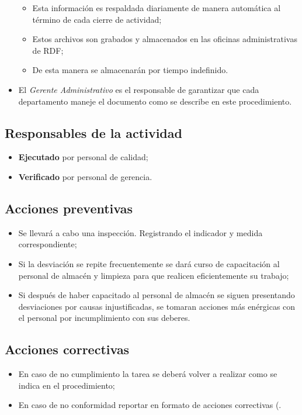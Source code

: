 \begin{itemize}
	\begin{itemize}
		\item Esta información es respaldada diariamente de manera automática al término de cada cierre de actividad;
		\item Estos archivos son grabados y almacenados en las oficinas administrativas de \gls{RDF};
		\item De esta manera se almacenarán por tiempo indefinido.
	\end{itemize}
	\item El \emph{Gerente Administrativo} es el responsable de garantizar que cada departamento maneje el documento como se describe en este procedimiento.
\end{itemize}

\subsection{Responsables de la actividad}
\begin{itemize}
	\item \textbf{Ejecutado} por personal de calidad;
	\item \textbf{Verificado} por personal de gerencia.
\end{itemize}

\subsection{Acciones preventivas}
\begin{itemize}
	\item Se llevará a cabo una inspección. Registrando el indicador y medida correspondiente;
	\item Si la desviación se repite frecuentemente se dará curso de capacitación al personal de almacén y limpieza para que realicen eficientemente su trabajo;
	\item Si después de haber capacitado al personal de almacén se siguen presentando desviaciones por causas injustificadas, se tomaran acciones más enérgicas con el personal por incumplimiento con sus deberes.
\end{itemize}

\subsection{Acciones correctivas}
\begin{itemize}
	\item En caso de no cumplimiento la tarea se deberá volver a realizar como se indica en el procedimiento;
	\item En caso de no conformidad reportar en formato de acciones correctivas (\RAC.
\end{itemize}

